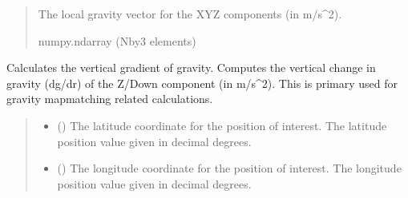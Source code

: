 \documentclass[letterpaper,10pt,english]{sphinxmanual}
\begin{document}
\begin{fulllineitems}
\begin{fulllineitems}
\begin{quote}
\begin{description}
\sphinxAtStartPar
The local gravity vector for the XYZ components (in m/s\textasciicircum{}2).

\sphinxAtStartPar
numpy.ndarray (N\sphinxhyphen{}by\sphinxhyphen{}3 elements)

\end{description}\end{quote}

\end{fulllineitems}


\begin{fulllineitems}
\label{\detokenize{modules/gravity/map:qnav.gravity.map.GravityMap.calc_vertical_grad}}
\pysigstartsignatures
{}
\pysigstopsignatures
\sphinxAtStartPar
Calculates the vertical gradient of gravity.
Computes the vertical change in gravity (dg/dr) of the Z/Down
component (in m/s\textasciicircum{}2). This is primary used for gravity map\sphinxhyphen{}matching
related calculations.
\begin{quote}\begin{description}
\begin{itemize}
\item {} 
\sphinxAtStartPar
{} () \textendash{} The latitude coordinate for the position of interest.
The latitude position value given in decimal degrees.

\item {} 
\sphinxAtStartPar
{} () \textendash{} The longitude coordinate for the position of interest.
The longitude position value given in decimal degrees.


\end{itemize}
\end{description}
\end{quote}
\end{fulllineitems}
\end{fulllineitems}
\end{document}
